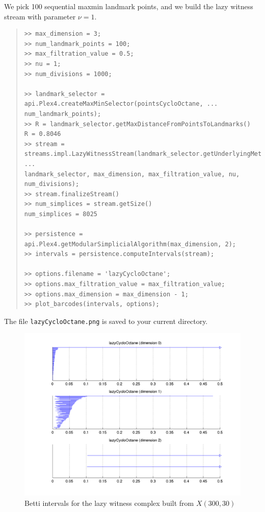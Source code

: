 \documentclass[amscd, amssymb, verbatim]{amsart}[12pt]
\theoremstyle{remark}
\theoremstyle{remark}
\theoremstyle{remark}
\begin{document}
We pick 100 sequential maxmin landmark points, and we build the lazy witness stream with parameter $\nu = 1$. 

\begin{quote} \begin{verbatim}
>> max_dimension = 3;
>> num_landmark_points = 100;
>> max_filtration_value = 0.5;
>> nu = 1;
>> num_divisions = 1000;

>> landmark_selector = api.Plex4.createMaxMinSelector(pointsCycloOctane, ...
num_landmark_points);
>> R = landmark_selector.getMaxDistanceFromPointsToLandmarks() 
R = 0.8046
>> stream = streams.impl.LazyWitnessStream(landmark_selector.getUnderlyingMetricSpace(), ...
landmark_selector, max_dimension, max_filtration_value, nu, num_divisions);
>> stream.finalizeStream()
>> num_simplices = stream.getSize()
num_simplices = 8025                         

>> persistence = api.Plex4.getModularSimplicialAlgorithm(max_dimension, 2);
>> intervals = persistence.computeIntervals(stream);

>> options.filename = 'lazyCycloOctane';
>> options.max_filtration_value = max_filtration_value;
>> options.max_dimension = max_dimension - 1;
>> plot_barcodes(intervals, options);
\end{verbatim} \end{quote}

The file \texttt{lazyCycloOctane.png} is saved to your current directory.

\begin{figure}[htp]
	\begin{center}
    	\includegraphics[width=6in]{lazyCycloOctane.png}
   	\end{center}
	\caption{Betti intervals for the lazy witness complex built from $X(300,30)$}
  	\label{fig:rangeBetti}
\end{figure}
\FloatBarrier
\end{document}
